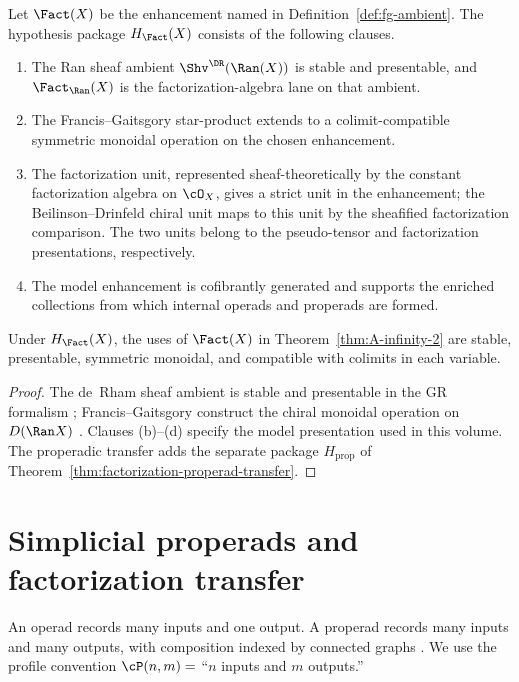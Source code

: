 \begin{proposition}
\label{prop:fg-ambient-properties}
Let $\Fact(X)$ be the enhancement named in
Definition~\ref{def:fg-ambient}. The hypothesis package
$H_{\Fact}(X)$ consists of the following clauses.
\begin{enumerate}[label=\textup{(\alph*)}]
\item The Ran sheaf ambient $\Shv^{\DR}(\Ran(X))$ is stable and
presentable, and $\Fact_{\Ran}(X)$ is the factorization-algebra lane on
that ambient.
\item The Francis--Gaitsgory star-product extends to a colimit-compatible
symmetric monoidal operation on the chosen enhancement.
\item The factorization unit, represented sheaf-theoretically by the
constant factorization algebra on $\cO_X$, gives a strict unit in the
enhancement; the Beilinson--Drinfeld chiral unit maps to this unit by
the sheafified factorization comparison.  The two units belong to the
pseudo-tensor and factorization presentations, respectively.
\item The model enhancement is cofibrantly generated and supports the
enriched collections from which internal operads and properads are
formed.
\end{enumerate}
Under $H_{\Fact}(X)$, the uses of $\Fact(X)$ in
Theorem~\ref{thm:A-infinity-2}
are stable, presentable, symmetric monoidal, and compatible with
colimits in each variable.
\end{proposition}

\begin{proof}
The de~Rham sheaf ambient is stable and presentable in the GR
formalism \cite[Chapter~I.3]{GR17}; Francis--Gaitsgory construct the
chiral monoidal operation on $D(\Ran X)$ \cite{Francis2012}.  Clauses
(b)--(d) specify the model presentation used in this volume.  The
properadic transfer adds the separate package $H_{\mathrm{prop}}$ of
Theorem~\ref{thm:factorization-properad-transfer}.
\end{proof}

\section{Simplicial properads and factorization transfer}
\label{sec:ainf2-properads}

An operad records many inputs and one output.  A properad records many
inputs and many outputs, with composition indexed by connected graphs
\cite{Val07}.  We use the profile convention
$\cP(n,m)=$ ``$n$ inputs and $m$ outputs.''

